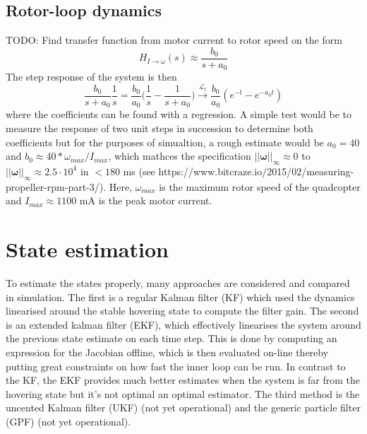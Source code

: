 \documentclass{article}
\begin{document}
\subsection{Rotor-loop dynamics}
TODO: Find transfer function from motor current to rotor speed on the form
\begin{equation}
H_{I\rightarrow \dot{\omega}}(s) \approx \frac{b_0}{s + a_0}
\end{equation}
The step response of the system is then
\begin{equation}
\frac{b_0}{s + a_0} \frac{1}{s} = \frac{b_0}{a_0}\Big(\frac{1}{s} - \frac{1}{s + a_0}\Big) \overset{\mathcal{L}_t}{\longrightarrow}
\frac{b_0}{a_0}(e^{-t} - e^{-a_0t})
\end{equation}
where the coefficients can be found with a regression. A simple test would be to measure the response of two unit steps in succession to determine both coefficients but for the purposes of simualtion, a rough estimate would be $a_0=40$ and $b_0 \approx 40*\omega_{max}/I_{max}$, which mathces the specification $||{\boldsymbol\omega}||_{\infty} \approx 0$ to $||{\boldsymbol\omega}||_{\infty} \approx 2.5\cdot 10^4$ in $< 180$ ms (see https://www.bitcraze.io/2015/02/measuring-propeller-rpm-part-3/). Here, $\omega_{max}$ is the maximum rotor speed of the quadcopter and $I_{max}\approx 1100$ mA is the peak motor current.

\section{State estimation}
To estimate the states properly, many approaches are considered and compared in simulation. The first is a regular Kalman filter (KF) which used the dynamics linearised around the stable hovering state to compute the filter gain. The second is an extended kalman filter (EKF), which effectively linearises the system around the previous state estimate on each time step. This is done by computing an expression for the Jacobian offline, which is then evaluated on-line thereby putting great constraints on how fast the inner loop can be run. In contrast to the KF, the EKF provides much better estimates when the system is far from the hovering state but it's not optimal an optimal estimator. The third method is the uncented Kalman filter (UKF) (not yet operational) and the generic particle filter (GPF) (not yet operational).
\end{document}
